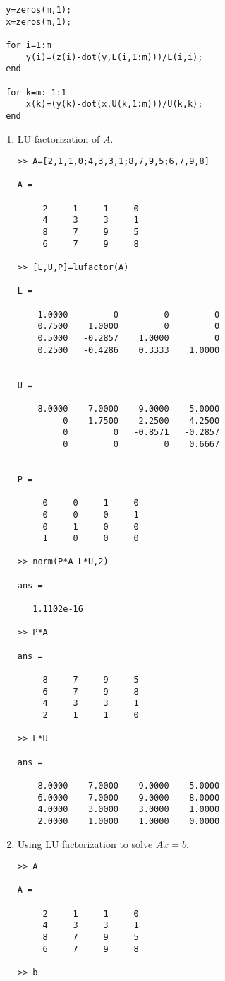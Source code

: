 \documentclass[12pt]{article}
\numberwithin{equation}{section}
\begin{document}
\begin{enumerate}
\begin{lstlisting}
 y=zeros(m,1);
 x=zeros(m,1);

 for i=1:m
     y(i)=(z(i)-dot(y,L(i,1:m)))/L(i,i);
 end

 for k=m:-1:1
     x(k)=(y(k)-dot(x,U(k,1:m)))/U(k,k);
 end
 \end{lstlisting}
\begin{enumerate} \item LU factorization of $A$.
\begin{lstlisting}>> A=[2,1,1,0;4,3,3,1;8,7,9,5;6,7,9,8]

A =

     2     1     1     0
     4     3     3     1
     8     7     9     5
     6     7     9     8

>> [L,U,P]=lufactor(A)

L =

    1.0000         0         0         0
    0.7500    1.0000         0         0
    0.5000   -0.2857    1.0000         0
    0.2500   -0.4286    0.3333    1.0000


U =

    8.0000    7.0000    9.0000    5.0000
         0    1.7500    2.2500    4.2500
         0         0   -0.8571   -0.2857
         0         0         0    0.6667


P =

     0     0     1     0
     0     0     0     1
     0     1     0     0
     1     0     0     0

>> norm(P*A-L*U,2)

ans =

   1.1102e-16

>> P*A

ans =

     8     7     9     5
     6     7     9     8
     4     3     3     1
     2     1     1     0

>> L*U

ans =

    8.0000    7.0000    9.0000    5.0000
    6.0000    7.0000    9.0000    8.0000
    4.0000    3.0000    3.0000    1.0000
    2.0000    1.0000    1.0000    0.0000
\end{lstlisting}
\item Using LU factorization to solve $Ax=b$.
\begin{lstlisting}
>> A

A =

     2     1     1     0
     4     3     3     1
     8     7     9     5
     6     7     9     8

>> b


\end{lstlisting}
\end{enumerate}
\end{enumerate}
\end{document}
